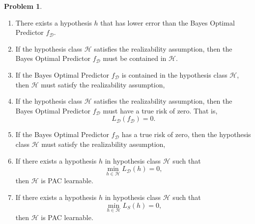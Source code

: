 \documentclass[10pt]{article}
\theoremstyle{definition}
\newtheorem{problem}{Problem}
\begin{document}
\begin{problem}
\begin{enumerate}
        \item
            There exists a hypothesis $h$ that has lower error than the Bayes Optimal Predictor $f_\mathcal D$.
            \vspace{3in}

        \item
            If the hypothesis class $\mathcal H$ satisfies the realizability assumption,
            then the Bayes Optimal Predictor $f_\mathcal D$ must be contained in $\mathcal H$.
            \vspace{3in}

        \item
            If the Bayes Optimal Predictor $f_\mathcal D$ is contained in the hypothesis class $\mathcal H$,
            then $\mathcal H$ must satisfy the realizability assumption,
            \vspace{3in}

        \item
            If the hypothesis class $\mathcal H$ satisfies the realizability assumption,
            then the Bayes Optimal Predictor $f_\mathcal D$ must have a true risk of zero.
            That is,
            \begin{equation}
                L_\mathcal D(f_\mathcal D) = 0.
            \end{equation}
            \vspace{4in}

        \item
            If the Bayes Optimal Predictor $f_\mathcal D$ has a true risk of zero,
            then the hypothesis class $\mathcal H$ must satisfy the realizability assumption,
            \vspace{4in}

        \item If there exists a hypothesis $h$ in hypothesis class $\mathcal H$ such that
            \begin{equation}
                \min_{h\in\mathcal H} L_\mathcal D (h) = 0
                ,
            \end{equation}
            then $\mathcal H$ is PAC learnable.
            \vspace{4in}

        \item If there exists a hypothesis $h$ in hypothesis class $\mathcal H$ such that
            \begin{equation}
                \min_{h\in\mathcal H} L_S (h) = 0
                ,
            \end{equation}
            then $\mathcal H$ is PAC learnable.
            \vspace{4in}


\end{enumerate}
\end{problem}
\end{document}
